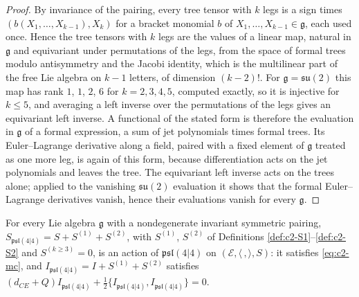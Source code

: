 \begin{proof}
By invariance of the pairing, every tree tensor with $k$ legs is a sign times $(b(X_1,\dots,X_{k-1}),X_k)$ for a bracket monomial $b$ of $X_1,\dots,X_{k-1}\in\mathfrak g$, each used once. Hence the tree tensors with $k$ legs are the values of a linear map, natural in $\mathfrak g$ and equivariant under permutations of the legs, from the space of formal trees modulo antisymmetry and the Jacobi identity, which is the multilinear part of the free Lie algebra on $k-1$ letters, of dimension $(k-2)!$. For $\mathfrak g=\mathfrak{su}(2)$ this map has rank $1$, $1$, $2$, $6$ for $k=2,3,4,5$, computed exactly, so it is injective for $k\le5$, and averaging a left inverse over the permutations of the legs gives an equivariant left inverse. A functional of the stated form is therefore the evaluation in $\mathfrak g$ of a formal expression, a sum of jet polynomials times formal trees. Its Euler--Lagrange derivative along a field, paired with a fixed element of $\mathfrak g$ treated as one more leg, is again of this form, because differentiation acts on the jet polynomials and leaves the tree. The equivariant left inverse acts on the trees alone; applied to the vanishing $\mathfrak{su}(2)$ evaluation it shows that the formal Euler--Lagrange derivatives vanish, hence their evaluations vanish for every $\mathfrak g$.
\end{proof}

\begin{theorem}
\label{thm:c2-master}
For every Lie algebra $\mathfrak g$ with a nondegenerate invariant symmetric pairing, $S_{\mathfrak{psl}(4|4)}=S+S^{(1)}+S^{(2)}$, with $S^{(1)}$, $S^{(2)}$ of Definitions \ref{def:c2-S1}--\ref{def:c2-S2} and $S^{(k\ge3)}=0$, is an action of $\mathfrak{psl}(4|4)$ on $(\mathscr E,\langle\,,\rangle,S)$: it satisfies \eqref{eq:c2-mc}, and $I_{\mathfrak{psl}(4|4)}=I+S^{(1)}+S^{(2)}$ satisfies $(d_{CE}+Q)I_{\mathfrak{psl}(4|4)}+\tfrac12\{I_{\mathfrak{psl}(4|4)},I_{\mathfrak{psl}(4|4)}\}=0$.
\end{theorem}

